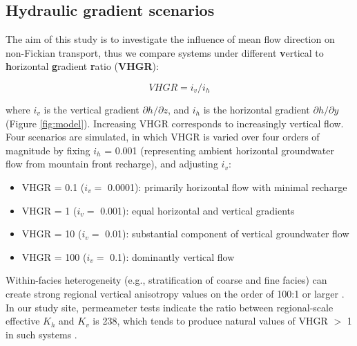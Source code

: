 


\subsection{Hydraulic gradient scenarios}
\label{ss_2_3}

The aim of this study is to investigate the influence of mean flow direction on non-Fickian transport, thus we compare systems under different \textbf{v}ertical to \textbf{h}orizontal \textbf{g}radient \textbf{r}atio (\textbf{VHGR}):

\begin{equation}
    VHGR = i_v / i_h
\label{eq:vhgr}
\end{equation}

where $i_v$ is the vertical gradient $\partial{h}/\partial{z}$, and $i_h$ is the horizontal gradient $\partial{h}/\partial{y}$ (Figure \ref{fig:model}). Increasing VHGR corresponds to increasingly vertical flow. Four scenarios are simulated, in which VHGR is varied over four orders of magnitude by fixing $i_h$ = 0.001 (representing ambient horizontal groundwater flow from mountain front recharge), and adjusting $i_v$:

\begin{itemize}
    \item VHGR = 0.1 ($i_v =$ 0.0001): primarily horizontal flow with minimal recharge
    \item VHGR = 1 ($i_v =$ 0.001): equal horizontal and vertical gradients  
    \item VHGR = 10 ($i_v =$ 0.01): substantial component of vertical groundwater flow
    \item VHGR = 100 ($i_v =$ 0.1): dominantly vertical flow 
\end{itemize}


Within-facies heterogeneity (e.g., stratification of coarse and fine facies) can create strong regional vertical anisotropy values on the order of 100:1 or larger \citep{freeze1979groundwater}. In our study site, permeameter tests indicate the ratio between regional-scale effective $K_h$ and $K_v$ is 238, which tends to produce natural values of VHGR $>$ 1 in such systems \citep[e.g.][]{fogg1986groundwater}. 

